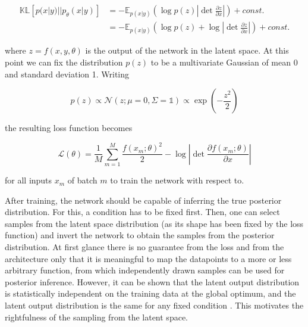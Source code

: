 \begin{equation*}
	\begin{aligned}
		\mathbb{KL}\left[p(x | y) || p_\theta(x | y) \right] &= - \mathbb{E}_{p(x | y)}\left(\log p(z) \left|\det\frac{\partial z}{\partial x}\right|\right) + const. \\
		&= - \mathbb{E}_{p(x | y)}\left(\log p(z)  + \log \left|\det\frac{\partial z}{\partial x}\right|\right) + const.
	\end{aligned}
\end{equation*}

where $z = f(x, y, \theta)$ is the output of the network in the latent space. At this point we can fix the distribution $p(z)$ to be a multivariate Gaussian of mean 0 and standard deviation 1. Writing

\begin{equation*}
	p(z) \propto \mathcal{N}(z; \mu = 0, \Sigma=\mathbb{1}) \propto \exp\left(-\frac{z^2}{2}\right)
\end{equation*}

the resulting loss function becomes

\begin{equation*}
	\mathcal{L}(\theta) = \frac{1}{M} \sum_{m=1}^{M} \frac{f(x_m; \theta)^2}{2} - \log\left|\det\frac{\partial f(x_m; \theta)}{\partial x}\right|
\end{equation*}

for all inputs $x_m$ of batch $m$ to train the network with respect to.

After training, the network should be capable of inferring the true posterior distribution. For this, a condition has to be fixed first. Then, one can select samples from the latent space distribution (as its shape has been fixed by the loss function) and invert the network to obtain the samples from the posterior distribution.
At first glance there is no guarantee from the loss and from the architecture only that it is meaningful to map the datapoints to a more or less arbitrary function, from which independently drawn samples can be used for posterior inference. However, it can be shown that the latent output distribution is statistically independent on the training data at the global optimum, and the latent output distribution is the same for any fixed condition \cite{BayesFlow}. This motivates the rightfulness of the sampling from the latent space.

